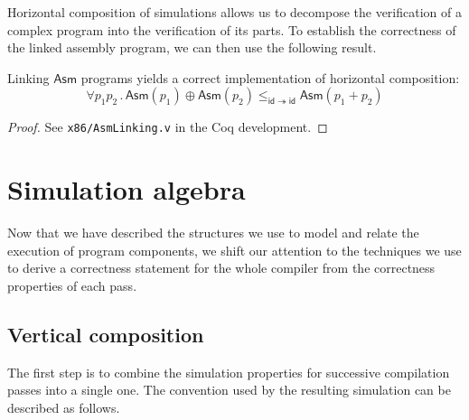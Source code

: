 \documentclass[acmsmall,screen,review,anonymous]{acmart}
\newcommand{\kw}[1]{\ensuremath{ \mathsf{#1} }}
\begin{document}
Horizontal composition of simulations
allows us to decompose the verification of a complex program
into the verification of its parts.
To establish the correctness of the linked assembly program,
we can then use the following result.

\begin{theorem} \label{thm:asmlinking} %
Linking \kw{Asm} programs
yields a correct implementation of
horizontal composition:
\[
    \forall p_1 p_2 \,.\,
      \kw{Asm}(p_1) \oplus \kw{Asm}(p_2)
      \le_{\kw{id} \twoheadrightarrow \kw{id}}
      \kw{Asm}(p_1 + p_2)
\]
\begin{proof}
See \texttt{x86/AsmLinking.v} in the Coq development.
\end{proof}
\end{theorem}



%
%
%


\section{Simulation algebra} \label{sec:simalg} %

Now that we have described the structures we use
to model and relate the execution of program components,
we shift our attention to the techniques we use
to derive a correctness statement for the whole compiler
from the correctness properties of each pass.

\subsection{Vertical composition} %

The first step is to combine the
simulation properties for successive compilation passes
into a single one.
The convention used by the resulting simulation
can be described as follows.
\end{document}

